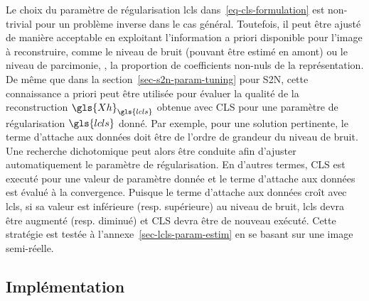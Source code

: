 Le choix du paramètre de régularisation \gls{lcls} dans~\eqref{eq-cls-formulation} est non-trivial pour un problème inverse dans le cas général. Toutefois, il peut être ajusté de manière acceptable en exploitant l'information a priori disponible pour l'image à reconstruire, comme le niveau de bruit (pouvant être estimé en amont) ou le niveau de parcimonie, \ie{}, la proportion de coefficients non-nuls de la représentation.
%
De même que dans la section~\ref{sec-s2n-param-tuning} pour S2N, cette connaissance a priori peut être utilisée pour évaluer la qualité de la reconstruction $\gls{Xh}_{\gls{lcls}}$ obtenue avec CLS pour une paramètre de régularisation $\gls{lcls}$ donné. Par exemple, pour une solution pertinente, le terme d'attache aux données doit être de l'ordre de grandeur du niveau de bruit. Une recherche dichotomique peut alors être conduite afin d'ajuster automatiquement le paramètre de régularisation. En d'autres termes, CLS est executé pour une valeur de paramètre donnée et le terme d'attache aux données est évalué à la convergence. Puisque le terme d'attache aux données croît avec \gls{lcls}, si sa valeur est inférieure (resp. supérieure) au niveau de bruit, \gls{lcls} devra être augmenté (resp. diminué) et CLS devra être de nouveau exécuté. Cette stratégie est testée à l'annexe~\ref{sec-lcls-param-estim} en se basant sur une image semi-réelle.

\subsection{Implémentation}\label{subsec-implementation-cls}

